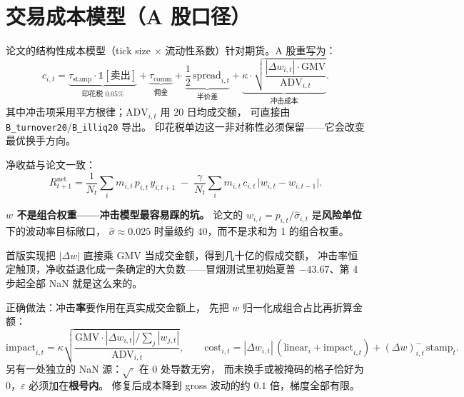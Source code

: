 \documentclass[11pt, a4paper]{ctexart}
\newcommand{\file}[1]{\texttt{\small #1}}
\begin{document}
\section{交易成本模型（A 股口径）}
\label{sec:cost}

论文的结构性成本模型（tick size $\times$ 流动性系数）针对期货。A 股重写为：
\begin{equation}
c_{i,t} = \underbrace{\tau_{\text{stamp}}\cdot \mathbb{1}[\text{卖出}]}_{\text{印花税 }0.05\%}
        + \underbrace{\tau_{\text{comm}}}_{\text{佣金}}
        + \underbrace{\frac{1}{2}\,\mathrm{spread}_{i,t}}_{\text{半价差}}
        + \underbrace{\kappa\cdot \sqrt{\frac{|\Delta w_{i,t}|\cdot \mathrm{GMV}}{\mathrm{ADV}_{i,t}}}}_{\text{冲击成本}} .
\end{equation}
其中冲击项采用平方根律；$\mathrm{ADV}_{i,t}$ 用 20 日均成交额，
可直接由 \file{B\_turnover20}/\file{B\_illiq20} 导出。
印花税单边这一非对称性必须保留——它会改变最优换手方向。

净收益与论文一致：
\begin{equation}
R^{\text{net}}_{t+1} = \frac{1}{N_t}\sum_i m_{i,t}\,p_{i,t}\,y_{i,t+1}
  \;-\; \frac{\gamma}{N_t}\sum_i m_{i,t}\,c_{i,t}\,\bigl|w_{i,t}-w_{i,t-1}\bigr| .
\end{equation}

\begin{warnbox}
\textbf{$w$ 不是组合权重——冲击模型最容易踩的坑。}
论文的 $w_{i,t} = p_{i,t}/\hat\sigma_{i,t}$ 是\textbf{风险单位}下的波动率目标敞口，
$\hat\sigma \approx 0.025$ 时量级约 $40$，而不是求和为 1 的组合权重。

首版实现把 $|\Delta w|$ 直接乘 GMV 当成交金额，得到几十亿的假成交额，
冲击率恒定触顶，净收益退化成一条确定的大负数——冒烟测试里初始夏普
$-43.67$、第 4 步起全部 NaN 就是这么来的。

正确做法：冲击\textbf{率}要作用在真实成交金额上，
先把 $w$ 归一化成组合占比再折算金额：
\begin{equation}
\mathrm{impact}_{i,t} = \kappa\sqrt{\frac{\mathrm{GMV}\cdot |\Delta w_{i,t}| \big/ \sum_j |w_{j,t}|}{\mathrm{ADV}_{i,t}}},
\qquad
\mathrm{cost}_{i,t} = |\Delta w_{i,t}|\,(\text{linear}_i + \mathrm{impact}_{i,t}) + (\Delta w)^-_{i,t}\,\text{stamp}_t .
\end{equation}
另有一处独立的 NaN 源：$\sqrt{\cdot}$ 在 $0$ 处导数无穷，
而未换手或被掩码的格子恰好为 $0$，$\varepsilon$ 必须加在\textbf{根号内}。
修复后成本降到 gross 波动的约 $0.1$ 倍，梯度全部有限。
\end{warnbox}
\end{document}
